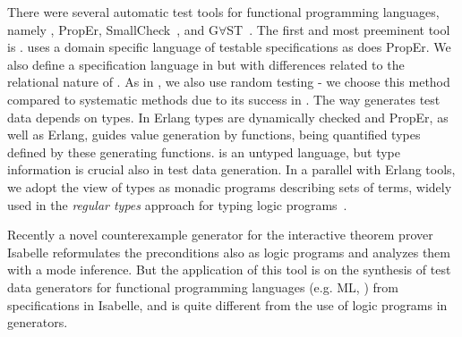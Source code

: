 There were several automatic test tools for functional programming
languages, namely \QuickCheck, {\sf PropEr}, {\sf SmallCheck}~\cite{runciman2008smallcheck},
and G$\forall$ST~\cite{koopman2003gast}.
The first and most preeminent tool is \QuickCheck{}.
\QuickCheck{} uses a domain specific language of testable specifications
as does {\sf PropEr}.
We also define a specification language in \plqc{} but with
differences related to the relational nature of \Prolog{}.%
As in \QuickCheck{}, we also use random testing - we choose this method
compared to systematic methods due to its success in \QuickCheck{}.
The way \QuickCheck{} generates test data depends on \Haskell{} types.
In {\sf Erlang} types are dynamically checked and {\sf PropEr}, as well
as {\sf Erlang}\QuickCheck{}, guides value generation by functions,
being quantified types defined by these generating functions.
\Prolog{} is an untyped language, but type information is crucial also in
\plqc{} test data generation.
In a parallel with {\sf Erlang} tools, we adopt the view of types as
monadic \Prolog{} programs describing sets of terms, widely used in the
{\em regular types} approach for typing logic programs~\cite{Yardeni:1991:TSL:110703.110705,fruhwirth1991logic,DBLP:conf/iclp/Zobel87,florido1992types}.

  Recently a novel counterexample generator for the interactive theorem prover Isabelle \cite{bulwahn2012smart} reformulates the preconditions also as logic programs and analyzes them with a mode inference. But the application of this tool is on the  synthesis of test data generators for functional programming languages (e.g. ML, \Haskell) from specifications in Isabelle, and is quite different from the use of logic programs in \plqc{} generators.




